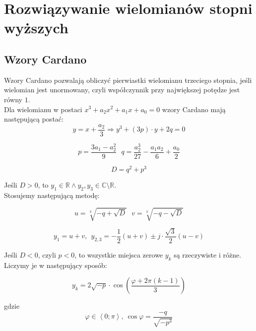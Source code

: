 \section*{Rozwiązywanie wielomianów stopni wyższych}
\subsection*{Wzory Cardano}
Wzory Cardano pozwalają obliczyć pierwiastki wielomianu trzeciego stopnia,
jeśli wielomian jest unormowany, czyli współczynnik przy największej
potędze jest równy $1$.\\
Dla wielomianu w postaci $x^3 + a_2x^2 + a_1x + a_0 = 0$ wzory
Cardano mają następującą postać:
\begin{equation*}
    y = x + \frac{a_2}{3} \Rightarrow y^3 + (3p) \cdot y + 2q = 0
\end{equation*}

\begin{equation*}
    p = \frac{3a_1 - a_2^2}{9}\ \ \ 
    q = \frac{a_2^3}{27} - \frac{a_1 a_2}{6} + \frac{a_0}{2}
\end{equation*}

\begin{equation*}
    D = q^2 + p^3
\end{equation*}

Jeśli $D > 0$, to $y_1 \in \mathbb{R} \land y_2, y_3 \in \mathbb{C} \setminus \mathbb{R}$.\\
Stosujemy następującą metodę:

\begin{equation*}
    u = \sqrt[3]{- q + \sqrt{D}}\ \ \ 
    v = \sqrt[3]{- q - \sqrt{D}}
\end{equation*}

\begin{equation*}
    y_1 = u + v,\ \ y_{2,3} = -\frac{1}{2}\left(u+v\right)
    \pm j \cdot \frac{\sqrt{3}}{2}\left(u-v\right)
\end{equation*}

Jeśli $D < 0$, czyli $p < 0$, to wszystkie miejsca zerowe $y_k$ są rzeczywiste i różne.\\
Liczymy je w następujący sposób:

\begin{equation*}
    y_k = 2 \sqrt{-p} \cdot \cos{\left(\frac{\varphi + 2\pi\left(k-1\right)}
    {3}\right)}
\end{equation*}

gdzie
$$ 
\varphi \in \left<0; \pi\right>,\ \cos{\varphi} = \frac{-q}{\sqrt{-p^3}}
$$\\

